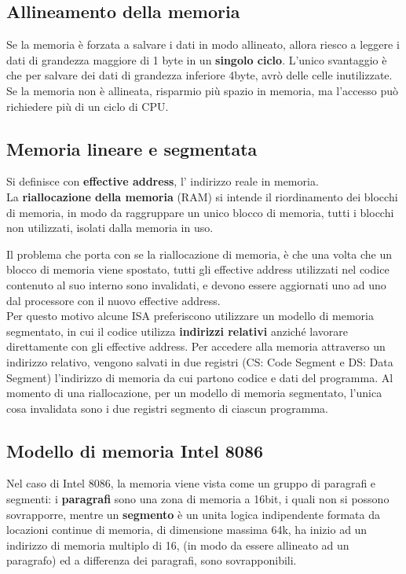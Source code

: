 \documentclass[../ace.tex]{subfiles}
\begin{document}
\subsection{Allineamento della memoria}
Se la memoria è forzata a salvare i dati in modo allineato, allora riesco a leggere i dati
di grandezza maggiore di 1 byte in un \textbf{singolo ciclo}.
L'unico svantaggio è che per salvare dei dati di grandezza inferiore 4byte, avrò delle
celle inutilizzate.
\\
Se la memoria non è allineata, risparmio più spazio in memoria, ma l'accesso può richiedere
più di un ciclo di CPU.

\subsection{Memoria lineare e segmentata}
Si definisce con \textbf{effective address}, l' indirizzo reale in memoria.
\\
La \textbf{riallocazione della memoria} (RAM) si intende il riordinamento dei blocchi di memoria,
in modo da raggruppare un unico blocco di memoria, tutti i blocchi non utilizzati, isolati
dalla memoria in uso.

Il problema che porta con se la riallocazione di memoria, è che una volta che un blocco di
memoria viene spostato, tutti gli effective address utilizzati nel codice contenuto al suo interno
sono invalidati, e devono essere aggiornati uno ad uno dal processore con il nuovo effective
address.
\\
Per questo motivo alcune ISA preferiscono utilizzare un modello di memoria segmentato,
in cui il codice utilizza \textbf{indirizzi relativi} anziché lavorare direttamente con gli effective address.
Per accedere alla memoria attraverso un indirizzo relativo, vengono salvati in due registri (CS: Code Segment
e DS: Data Segment) l'indirizzo di memoria da cui partono codice e dati del programma.
Al momento di una riallocazione, per un modello di memoria segmentato, l'unica cosa invalidata
sono i due registri segmento di ciascun programma.

\subsection{Modello di memoria Intel 8086}
Nel caso di Intel 8086, la memoria viene vista come un gruppo di paragrafi e segmenti:
i \textbf{paragrafi} sono una zona di memoria a 16bit, i quali non si possono sovrapporre,
mentre un \textbf{segmento} è un unita logica indipendente formata da locazioni continue di memoria, di
dimensione massima 64k, ha inizio ad un indirizzo di memoria
multiplo di 16, (in modo da essere allineato ad un paragrafo) ed a differenza dei paragrafi,
sono sovrapponibili.
\end{document}
